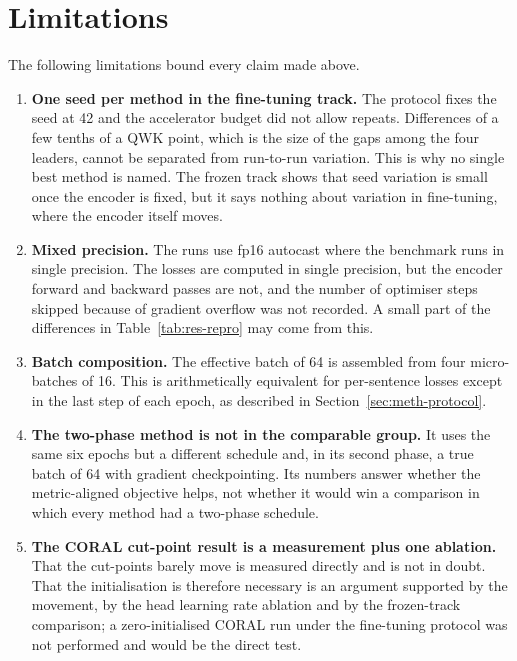 \section{Limitations}
\label{sec:res-limits}

The following limitations bound every claim made above.

\begin{enumerate}
\item \textbf{One seed per method in the fine-tuning track.} The protocol fixes the seed at 42
and the accelerator budget did not allow repeats. Differences of a few tenths of a QWK point,
which is the size of the gaps among the four leaders, cannot be separated from run-to-run
variation. This is why no single best method is named. The frozen track shows that seed
variation is small once the encoder is fixed, but it says nothing about variation in
fine-tuning, where the encoder itself moves.

\item \textbf{Mixed precision.} The runs use fp16 autocast where the benchmark runs in single
precision. The losses are computed in single precision, but the encoder forward and backward
passes are not, and the number of optimiser steps skipped because of gradient overflow was not
recorded. A small part of the differences in Table~\ref{tab:res-repro} may come from this.

\item \textbf{Batch composition.} The effective batch of 64 is assembled from four micro-batches
of 16. This is arithmetically equivalent for per-sentence losses except in the last step of each
epoch, as described in Section~\ref{sec:meth-protocol}.

\item \textbf{The two-phase method is not in the comparable group.} It uses the same six epochs
but a different schedule and, in its second phase, a true batch of 64 with gradient
checkpointing. Its numbers answer whether the metric-aligned objective helps, not whether it
would win a comparison in which every method had a two-phase schedule.

\item \textbf{The CORAL cut-point result is a measurement plus one ablation.} That the
cut-points barely move is measured directly and is not in doubt. That the initialisation is
therefore necessary is an argument supported by the movement, by the head learning rate
ablation and by the frozen-track comparison; a zero-initialised CORAL run under the fine-tuning
protocol was not performed and would be the direct test.


\end{enumerate}

